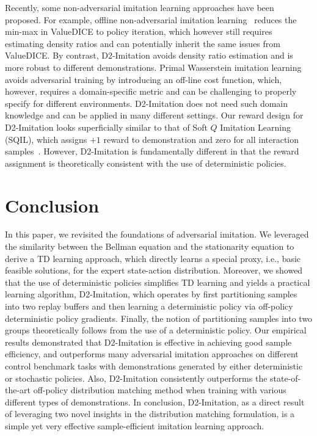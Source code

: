 \documentclass[letterpaper]{article} %
\begin{document}
Recently, some non-adversarial imitation learning approaches have been proposed.
For example, offline non-adversarial imitation learning~\cite{arenz2020non} reduces the min-max in ValueDICE to policy iteration,
which however still requires estimating density ratios and can potentially inherit the same issues from ValueDICE.
By contrast, D2-Imitation avoids density ratio estimation and is more robust to different demonstrations.
Primal Wasserstein imitation learning~\cite{dadashi2020primal} avoids adversarial training by introducing an off-line cost function,
which, however, requires a domain-specific metric and can be challenging to properly specify for different environments.
D2-Imitation does not need such domain knowledge and can be applied in many different settings.
Our reward design for D2-Imitation looks superficially similar to that of Soft $Q$ Imitation Learning (SQIL),
which assigns $+1$ reward to demonstration and zero for all interaction samples~\cite{reddy2019sqil}.
However, D2-Imitation is fundamentally different in that the reward assignment is theoretically consistent with the use of deterministic policies.


\section{Conclusion}
In this paper, we revisited the foundations of adversarial imitation.
We leveraged the similarity between the Bellman equation and the stationarity equation to derive a TD learning approach, which directly learns a special proxy, i.e., basic feasible solutions, for the expert state-action distribution.
Moreover, we showed that the use of deterministic policies simplifies TD learning and yields a practical learning algorithm,
D2-Imitation, which operates by first partitioning samples into two replay buffers and then learning a deterministic policy via off-policy deterministic policy gradients.
Finally, the notion of partitioning samples into two groups theoretically follows from the use of a deterministic policy.
Our empirical results demonstrated that D2-Imitation is effective in achieving good sample efficiency, and outperforms many adversarial imitation approaches on different control benchmark tasks with demonstrations generated by either deterministic or stochastic policies.
Also, D2-Imitation consistently outperforms the state-of-the-art off-policy distribution matching method when training with various different types of demonstrations.
In conclusion, D2-Imitation, as a direct result of leveraging two novel insights in the distribution matching formulation, is a simple yet very effective sample-efficient imitation learning approach.
\end{document}
